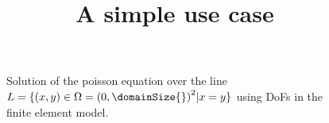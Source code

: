 \documentclass[12pt]{article}
\title{A simple use case}
\begin{document}
\maketitle

\begin{figure}[h]
    \centering%
    \caption{Solution of the poisson equation over the line $L = \{(x, y)\in\Omega = {(0, \domainSize{})}^2 | x = y\}$ using \numDofs{} DoFs in the finite element model.}%
\end{figure}
\end{document}
